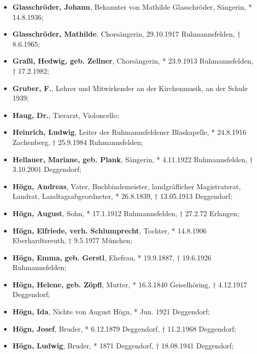 \begin{itemize}
\item \textbf{Glasschröder, Johann}, Bekannter von Mathilde
Glasschröder, Sängerin, * 14.8.1936;

\item \textbf{Glasschröder, Mathilde}, Chorsängerin, 29.10.1917
Ruhmannsfelden, † 8.6.1965;

\item \textbf{Graßl, Hedwig, geb. Zellner}, Chorsängerin, * 23.9.1913
Ruhmannsfelden, † 17.2.1982;

\item \textbf{Gruber, F.}, Lehrer und Mitwirkender an der
Kirchenmusik, an der Schule 1939;

\item \textbf{Haug, Dr.}, Tierarzt, Violoncello;

\item \textbf{Heinrich, Ludwig}, Leiter der Ruhmannsfeldener
Blaskapelle, * 24.8.1916 Zachenberg, † 25.9.1984 Ruhmannsfelden;

\item \textbf{Hellauer, Mariane, geb. Plank}, Sängerin, * 4.11.1922
Ruhmannsfelden, † 3.10.2001 Deggendorf;

\item \textbf{Högn, Andreas}, Vater, Buchbindemeister, landgräflicher
Magistratsrat, Landrat, Landtagsabgeordneter, * 26.8.1839, † 13.05.1913
Deggendorf;

\item \textbf{Högn, August}, Sohn, * 17.1.1912 Ruhmannsfelden,
† 27.2.72 Erlangen;

\item \textbf{Högn, Elfriede, verh. Schlumprecht}, Tochter, * 14.8.1906
Eberhardtsreuth, † 9.5.1977 München;

\item \textbf{Högn, Emma, geb. Gerstl}, Ehefrau, * 19.9.1887, †
19.6.1926 Ruhmannsfelden;

\item \textbf{Högn, Helene, geb. Zöpfl}, Mutter, * 16.3.1840
Geiselhöring, † 4.12.1917 Deggendorf;

\item \textbf{Högn, Ida}, Nichte von August Högn, * Jun. 1921
Deggendorf;

\item \textbf{Högn, Josef}, Bruder, * 6.12.1879 Deggendorf, †
11.2.1968 Deggendorf;

\item \textbf{Högn, Ludwig}, Bruder, * 1871 Deggendorf, † 18.08.1941
Deggendorf;


\end{itemize}

